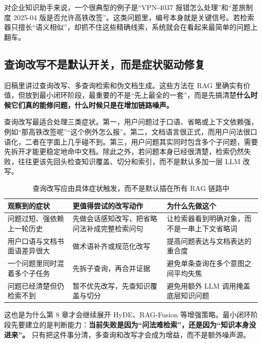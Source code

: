 对企业知识助手来说，一个很典型的例子是“VPN-4037 报错怎么处理”和“差旅制度 2025-04 版是否允许高铁改签”。这类问题里，编号本身就是关键信号。若检索器只擅长“语义相似”，却抓不住这些精确线索，系统就会在看起来最简单的问题上翻车。

\subsection{查询改写不是默认开关，而是症状驱动修复}
旧稿里讲过查询改写、多查询检索和伪文档生成。这些方法在 RAG 里确实有价值，但放到最小闭环阶段，最重要的不是“先上最全的一套”，而是先搞清楚\textbf{什么时候它们真的能修问题，什么时候只是在增加链路噪声。}

查询改写最适合处理三类症状。第一，用户问题过于口语、省略或上下文依赖强，例如“那高铁改签呢”“这个例外怎么报”。第二，文档语言很正式，而用户问法很口语化，二者在字面上几乎碰不到。第三，用户问题其实同时包含多个子问题，需要先拆开才能更稳定地命中文档。除此之外，若问题本身已经很清楚，检索仍然失败，往往更该先回头检查知识覆盖、切分和索引，而不是默认多加一层 LLM 改写。

\begin{table}[H]
\centering
\small
\begin{tabularx}{\textwidth}{>{\raggedright\arraybackslash}p{3cm}>{\raggedright\arraybackslash}p{3.2cm}>{\raggedright\arraybackslash}X}
\toprule
\textbf{观察到的症状} & \textbf{更值得尝试的改写动作} & \textbf{为什么先做这个} \\
\midrule
问题过短、强依赖上一轮历史 & 先做会话感知改写，把省略问法补成完整检索问句 & 让检索器看到明确对象，而不是一串上下文省略词 \\
用户口语与文档书面语差异很大 & 做术语补齐或规范化改写 & 提高问题表达与文档表达的重合度 \\
一个问题里同时混着多个子任务 & 先拆子查询，再合并证据 & 避免单条查询在多个意图之间平均失焦 \\
问题已经清楚但仍检索不到 & 暂不优先改写，先查知识覆盖与切分 & 避免用额外 LLM 调用掩盖底层知识问题 \\
\bottomrule
\end{tabularx}
\caption{查询改写应由具体症状触发，而不是默认插在所有 RAG 链路中}
\label{tab:rag-query-rewrite-when}
\end{table}

这也是为什么第 8 章才会继续展开 HyDE、RAG-Fusion 等增强策略。最小闭环阶段先要建立的是判断能力：\textbf{当前失败是因为“问法难检索”，还是因为“知识本身没进来”。} 只有把这件事分清，多查询和改写才会成为增益，而不是额外噪声源。

